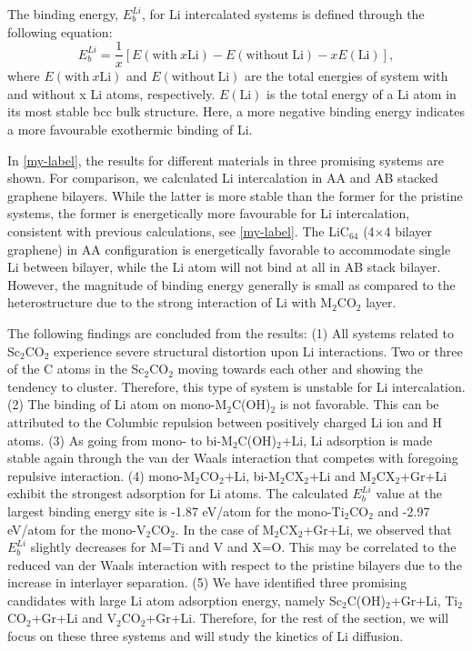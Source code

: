 The binding energy, $E_{b}^{Li}$, for Li intercalated systems is defined through the following equation:
\begin{equation}
E_{b}^{Li}=\frac{1}{x}[E(\mathrm{with~}x\mathrm{Li})-E(\mathrm{without~Li})-xE(\mathrm{Li})],
\end{equation}
where $E(\mathrm{with~}x\mathrm{Li})$ and $E(\mathrm{without~Li})$ are the total energies of system with and without x Li atoms, respectively. $E(\mathrm{Li})$ is the total energy of a Li atom in its most stable bcc bulk structure. Here, a more negative binding energy indicates a more favourable exothermic binding of Li. 

In \autoref{my-label}, the results for different materials in three promising systems are shown. For comparison, we calculated Li intercalation in AA and AB stacked graphene bilayers. While the latter is more stable than the former for the pristine systems, the former is energetically more favourable for Li intercalation, consistent with previous calculations\cite{PhysRevB.93.245438}, see \autoref{my-label}.  The LiC$_{64}$ (4$\times$4 bilayer graphene) in AA configuration is energetically favorable to accommodate single Li between bilayer, while the Li atom will not bind at all in AB stack bilayer. However, the magnitude of binding energy generally is small as compared to the heterostructure due to the strong interaction of Li with M$_2$CO$_2$ layer.


The following findings are concluded from the results: 
(1) All systems related to Sc$_2$CO$_2$ experience severe structural distortion upon Li interactions. Two or three of the C atoms in the Sc$_2$CO$_2$ moving towards each other and showing the tendency to cluster. Therefore, this type of system is unstable for Li intercalation. 
(2) The binding of Li atom on mono-M$_2$C(OH)$_2$ is not favorable. This can be attributed to the Columbic repulsion between positively charged Li ion and H atoms. 
(3) As going from mono- to bi-M$_2$C(OH)$_2$+Li, Li adsorption is made stable again through the van der Waals interaction that competes with foregoing repulsive interaction.  
(4) mono-M$_2$CO$_2$+Li,  bi-M$_2$CX$_2$+Li and M$_2$CX$_2$+Gr+Li exhibit the strongest adsorption for Li atoms. The calculated $E_{b}^{Li}$ value at the largest binding energy site is -1.87 eV/atom for the mono-Ti$_2$CO$_2$ and -2.97 eV/atom for the mono-V$_2$CO$_2$. In the case of M$_2$CX$_2$+Gr+Li, we observed that $E_{b}^{Li}$ slightly decreases for M=Ti and V and X=O.  This may be correlated to the reduced van der Waals interaction with respect to the pristine bilayers due to the increase in interlayer separation.  
(5) We have identified three promising candidates with large Li atom adsorption energy, namely Sc$_2$C(OH)$_2$+Gr+Li, Ti$_2$CO$_2$+Gr+Li and V$_2$CO$_2$+Gr+Li. Therefore, for the rest of the section, we will focus on these three systems and will study the kinetics of Li diffusion. 

